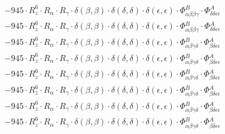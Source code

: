 \documentclass{article}
\begin{document}
\begin{subequations}
\begin{gather}
\begin{array}{c}
 \\[0.2em] 		 - 945 \cdot R_{z}^{6} \cdot R_{\alpha{}} \cdot R_{\gamma{}} \cdot \delta{}\left(\beta{}, \beta{}\right) \cdot \delta{}\left(\delta{}, \delta{}\right) \cdot \delta{}\left(\epsilon{}, \epsilon{}\right) \cdot \Phi{}^{B}_{\alpha{}\beta{}\beta{}\gamma{}} \cdot \Phi{}^{A}_{\delta{}\delta{}\epsilon{}\epsilon{}} 
 \\[0.2em] 		 - 945 \cdot R_{z}^{6} \cdot R_{\alpha{}} \cdot R_{\gamma{}} \cdot \delta{}\left(\beta{}, \beta{}\right) \cdot \delta{}\left(\delta{}, \delta{}\right) \cdot \delta{}\left(\epsilon{}, \epsilon{}\right) \cdot \Phi{}^{B}_{\alpha{}\beta{}\beta{}\gamma{}} \cdot \Phi{}^{A}_{\delta{}\delta{}\epsilon{}\epsilon{}} 
 \\[0.2em] 		 - 945 \cdot R_{z}^{6} \cdot R_{\alpha{}} \cdot R_{\gamma{}} \cdot \delta{}\left(\beta{}, \beta{}\right) \cdot \delta{}\left(\delta{}, \delta{}\right) \cdot \delta{}\left(\epsilon{}, \epsilon{}\right) \cdot \Phi{}^{B}_{\alpha{}\beta{}\gamma{}\delta{}} \cdot \Phi{}^{A}_{\beta{}\delta{}\epsilon{}\epsilon{}} 
 \\[0.2em] 		 - 945 \cdot R_{z}^{6} \cdot R_{\alpha{}} \cdot R_{\gamma{}} \cdot \delta{}\left(\beta{}, \beta{}\right) \cdot \delta{}\left(\delta{}, \delta{}\right) \cdot \delta{}\left(\epsilon{}, \epsilon{}\right) \cdot \Phi{}^{B}_{\alpha{}\beta{}\gamma{}\delta{}} \cdot \Phi{}^{A}_{\beta{}\delta{}\epsilon{}\epsilon{}} 
 \\[0.2em] 		 - 945 \cdot R_{z}^{6} \cdot R_{\alpha{}} \cdot R_{\gamma{}} \cdot \delta{}\left(\beta{}, \beta{}\right) \cdot \delta{}\left(\delta{}, \delta{}\right) \cdot \delta{}\left(\epsilon{}, \epsilon{}\right) \cdot \Phi{}^{B}_{\alpha{}\beta{}\gamma{}\delta{}} \cdot \Phi{}^{A}_{\beta{}\delta{}\epsilon{}\epsilon{}} 
 \\[0.2em] 		 - 945 \cdot R_{z}^{6} \cdot R_{\alpha{}} \cdot R_{\gamma{}} \cdot \delta{}\left(\beta{}, \beta{}\right) \cdot \delta{}\left(\delta{}, \delta{}\right) \cdot \delta{}\left(\epsilon{}, \epsilon{}\right) \cdot \Phi{}^{B}_{\alpha{}\beta{}\gamma{}\delta{}} \cdot \Phi{}^{A}_{\beta{}\delta{}\epsilon{}\epsilon{}} 
 \\[0.2em] 		 - 945 \cdot R_{z}^{6} \cdot R_{\alpha{}} \cdot R_{\gamma{}} \cdot \delta{}\left(\beta{}, \beta{}\right) \cdot \delta{}\left(\delta{}, \delta{}\right) \cdot \delta{}\left(\epsilon{}, \epsilon{}\right) \cdot \Phi{}^{B}_{\alpha{}\beta{}\gamma{}\delta{}} \cdot \Phi{}^{A}_{\beta{}\delta{}\epsilon{}\epsilon{}} 
 \\[0.2em] 		 - 945 \cdot R_{z}^{6} \cdot R_{\alpha{}} \cdot R_{\gamma{}} \cdot \delta{}\left(\beta{}, \beta{}\right) \cdot \delta{}\left(\delta{}, \delta{}\right) \cdot \delta{}\left(\epsilon{}, \epsilon{}\right) \cdot \Phi{}^{B}_{\alpha{}\beta{}\gamma{}\delta{}} \cdot \Phi{}^{A}_{\beta{}\delta{}\epsilon{}\epsilon{}} 

\end{array}
\end{gather}
\end{subequations}
\end{document}
